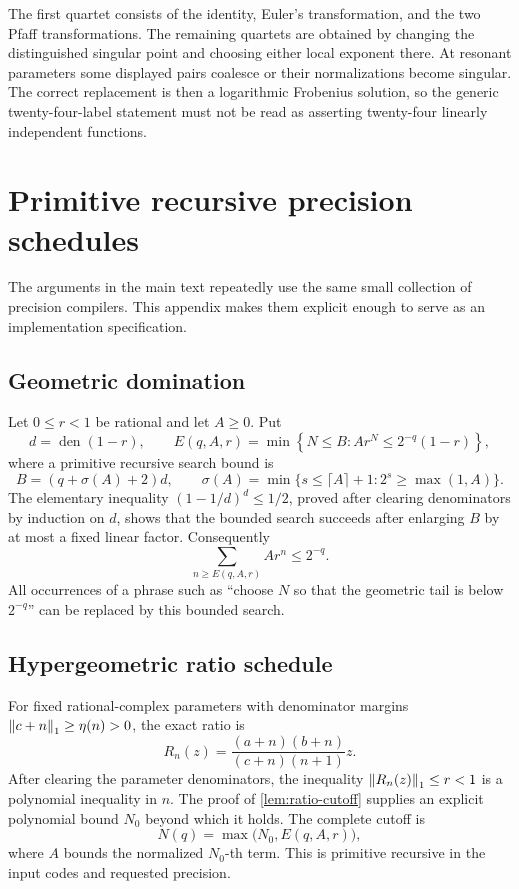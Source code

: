 The first quartet consists of the identity, Euler's transformation, and the
two Pfaff transformations.  The remaining quartets are obtained by changing
the distinguished singular point and choosing either local exponent there.
At resonant parameters some displayed pairs coalesce or their normalizations
become singular.  The correct replacement is then a logarithmic Frobenius
solution, so the generic twenty-four-label statement must not be read as
asserting twenty-four linearly independent functions.

\section{Primitive recursive precision schedules}\label{app:schedules}

The arguments in the main text repeatedly use the same small collection of
precision compilers.  This appendix makes them explicit enough to serve as an
implementation specification.

\subsection{Geometric domination}

Let \(0\le r<1\) be rational and let \(A\ge0\).  Put
\[
 d=\operatorname{den}(1-r),\qquad
 E(q,A,r)=\min\left\{N\le B:
 A r^N\le 2^{-q}(1-r)\right\},
\]
where a primitive recursive search bound is
\[
 B=(q+\sigma(A)+2)d,
 \qquad
 \sigma(A)=\min\{s\le \lceil A\rceil+1:2^s\ge\max(1,A)\}.
\]
The elementary inequality \((1-1/d)^d\le 1/2\), proved after clearing
denominators by induction on \(d\), shows that the bounded search succeeds
after enlarging \(B\) by at most a fixed linear factor.  Consequently
\[
 \sum_{n\ge E(q,A,r)} A r^n\le 2^{-q}.
\]
All occurrences of a phrase such as ``choose \(N\) so that the geometric tail
is below \(2^{-q}\)'' can be replaced by this bounded search.

\subsection{Hypergeometric ratio schedule}

For fixed rational-complex parameters with denominator margins
\(\left\lVert c+n\right\rVert_1\ge\eta(n)>0\), the exact ratio is
\[
 R_n(z)=\frac{(a+n)(b+n)}{(c+n)(n+1)}z.
\]
After clearing the parameter denominators, the inequality
\(\left\lVert R_n(z)\right\rVert_1\le r<1\) is a polynomial inequality in \(n\).  The proof of
\cref{lem:ratio-cutoff} supplies an explicit polynomial bound \(N_0\) beyond
which it holds.  The complete cutoff is
\[
 N(q)=\max\bigl(N_0,E(q,A,r)\bigr),
\]
where \(A\) bounds the normalized \(N_0\)-th term.  This is primitive
recursive in the input codes and requested precision.

